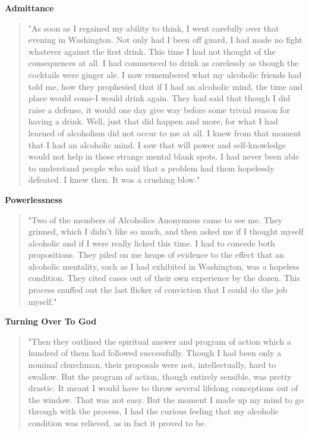 \begin{biblechapter}
\textbf{Admittance}

\begin{quote}
"As soon as I regained my ability to think, I went carefully over that evening in Washington. 
Not only had I been off guard, I had made no fight whatever against the first drink. 
This time I had not thought of the consequences at all. 
I had commenced to drink as carelessly as though the cocktails were ginger ale. 
I now remembered what my alcoholic friends had told me, 
how they prophesied that if I had an alcoholic mind, 
the time and place would come-I would drink again. 
They had said that though I did raise a defense, 
it would one day give way before some trivial reason for having a drink. 
Well, just that did happen and more, 
for what I had learned of alcoholism did not occur to me at all. 
I knew from that moment that I had an alcoholic mind. 
I saw that will power and self-knowledge would not help in those strange mental blank spots. 
I had never been able to understand people who said that a problem had them hopelessly defeated. 
I knew then. 
It was a crushing blow."
\end{quote}

\textbf{Powerlessness}

\begin{quote}
"Two of the members of Alcoholics Anonymous came to see me. 
They grinned, which I didn't like so much, 
and then asked me if I thought myself alcoholic and if I were really licked this time. 
I had to concede both propositions. 
They piled on me heaps of evidence to the effect that an alcoholic mentality, 
such as I had exhibited in Washington, was a hopeless condition. 
They cited cases out of their own experience by the dozen. 
This process snuffed out the last flicker of conviction that I could do the job myself."
\end{quote}

\textbf{Turning Over To God}

\begin{quote}
"Then they outlined the spiritual answer and program of action which a hundred of them had followed successfully. 
Though I had been only a nominal churchman, their proposals were not, intellectually, hard to swallow. 
But the program of action, though entirely sensible, was pretty drastic. 
It meant I would have to throw several lifelong conceptions out of the window. 
That was not easy. 
But the moment I made up my mind to go through with the process, 
I had the curious feeling that my alcoholic condition was relieved, 
as in fact it proved to be.
\end{quote}


\end{biblechapter}

